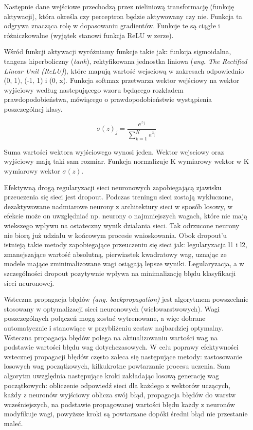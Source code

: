 \documentclass[a4paper,12pt]{article}
\begin{document}
        Następnie dane wejściowe przechodzą przez nieliniową transformację (funkcję aktywacji), która określa czy perceptron będzie aktywowany czy nie. Funkcja ta odgrywa znacząca rolę w dopasowaniu gradientów. Funkcje te są ciągłe i różniczkowalne (wyjątek stanowi funkcja ReLU w zerze).
        
        Wśród funkcji aktywacji wyróżniamy funkcje takie jak: funkcja sigmoidalna,  tangens hiperboliczny (\textit{tanh}), rektyfikowana jednostka liniowa (\textit{ang. The Rectified Linear Unit (ReLU)}), 
        które mapują wartość wejsciową w zakresach odpowiednio (0, 1), (-1, 1) i (0, x). Funkcja softmax przetwarza wektor wejściowy na wektor wyjściowy według nastepującego wzoru będącego rozkładem prawdopodobieństwa, mówiącego o prawdopodobieństwie wystąpienia poszczególnej klasy. 
        
        \begin{displaymath}
            \sigma (z)_{j} = \frac{e^{z_{j}}}{ \sum_{k=1}^K e^{z_{j}}}
        \end{displaymath}

        Suma wartości wektora wyjściowego wynosi jeden. Wektor wejsciowy oraz wyjściowy mają taki sam rozmiar. Funkcja normalizuje K wymiarowy wektor w K wymiarowy wektor  $ \sigma (z)$. 
        
        \par 
        Efektywną drogą regularyzacji sieci neuronowych zapobiegającą zjawisku przeuczenia się sieci jest dropout. 
        Podczas treningu sieci zostają wykluczone, dezaktywowane nadmiarowe neurony z architektury sieci w sposób losowy, w efekcie może on uwzględniać np. neurony o najmniejszych wagach, które nie mają wiekszego wpływu na ostateczny wynik działania sieci. Tak odrzucone neurony nie biorą już udziału w końcowym procesie wnioskowania. Obok dropout'u istnieją takie metody zapobiegające przeuczeniu się sieci jak: legularyzacja l1 i l2, zmanejszające wartość absolutną, pierwiastek kwadratowy wag, uznając ze modele mające zminimalizowane wagi osiągają lepsze wyniki. Legularyzacja, a w szczególności dropout pozytywnie wpływa na minimalizację błędu klasyfikacji sieci neuronowej. 
        
	    Wsteczna propagacja błędów \textit{(ang. backpropagation)} jest
        algorytmem powszechnie stosowany w optymalizacji sieci neuronowych (wielowarstwowych). Wagi poszczególnych połączeń mogą zostać wytrenowane, a więc dobrane automatycznie i stanowiące w przybliżeniu zestaw najbardziej optymalny. Wsteczna propagacja błędów polega na aktualizowaniu wartości wag na podstawie wartości błędu wag dotychczasowych. W celu poprawy efektywności wstecznej propagacji błędów często zaleca się następujące metody: 
        zastosowanie losowych wag początkowych, kilkukrotne powtarzanie procesu uczenia. Sam algorytm uwzględnia następujące kroki zakładając losową generację wag początkowych: obliczenie odpowiedź sieci dla każdego z wektorów uczących, każdy z neuronów wyjściowy oblicza swój błąd, propagacja błędów do warstw wcześniejszych, na podstawie propagowanej wartości błędu każdy z neuronów modyfikuje wagi, powyższe kroki są powtarzane dopóki średni błąd nie przestanie maleć.
\end{document}
